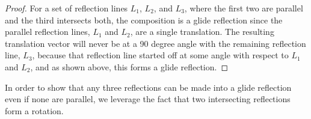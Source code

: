 \documentclass[11pt]{article}
\theoremstyle{definition}
\begin{document}
\begin{proof}
  For a set of reflection lines $L_{1}$, $L_{2}$, and $L_{3}$, where the first
  two are parallel and the third intersects both, the composition is a glide
  reflection since the parallel reflection lines, $L_{1}$ and $L_{2}$, are a
  single translation. The resulting translation vector will never be at a 90
  degree angle with the remaining reflection line, $L_{3}$, because that
  reflection line started off at some angle with respect to $L_{1}$ and
  $L_{2}$, and as shown above, this forms a glide reflection.
\end{proof}

In order to show that any three reflections can be made into a glide
reflection even if none are parallel, we leverage the fact that two
intersecting reflections form a rotation.
\end{document}
